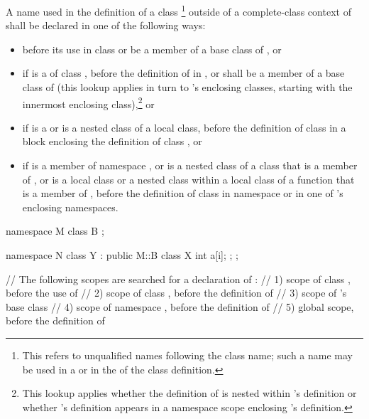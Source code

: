 \pnum
A name used in the definition of a class %
\footnote{This
refers to unqualified names following the class name;
such a name may be used in a  or
in the  of the class definition.}
outside of a complete-class context of 
shall be declared in one of the following ways:
\begin{itemize}
\item before its use in class  or be a member of a base class
of , or
\item if  is a  of class
, before the definition of  in
, or shall be a member of a base class of  (this
lookup applies in turn to 's enclosing classes, starting with
the innermost enclosing class),\footnote{This lookup applies whether the
definition of  is
nested within 's definition or whether 's definition
appears in a namespace scope enclosing 's
definition.}
or
\item if  is a  or is a nested
class of a local class, before the definition of class  in a
block enclosing the definition of class , or
\item if  is a member of namespace , or is a nested
class of a class that is a member of , or is a local class or a
nested class within a local class of a function that is a member of
, before the definition of class  in namespace
 or in one of 's enclosing namespaces.
\end{itemize}
\begin{example}
\begin{codeblock}
namespace M {
  class B { };
}

\end{codeblock}
\begin{codeblock}
namespace N {
  class Y : public M::B {
    class X {
      int a[i];
    };
  };
}

// The following scopes are searched for a declaration of :
// 1) scope of class , before the use of 
// 2) scope of class , before the definition of 
// 3) scope of 's base class 
// 4) scope of namespace , before the definition of 
// 5) global scope, before the definition of 
\end{codeblock}
\end{example}
